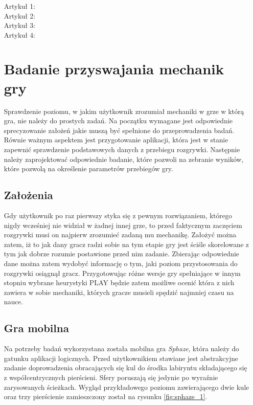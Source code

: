 \documentclass[a4paper,12pt,numbers=noenddot]{report}
\begin{document}
Artykuł 1: \cite{art_UsabilityEvaluationSystematicReview}\\
Artykuł 2: \cite{art_evaluationOfMGevaluationSystem}\\
Artykuł 3: \cite{art_playabilityHeuristics}\\
Artykuł 4: \cite{art_evaluationOfMG}


\chapter{Badanie przyswajania mechanik gry}
Sprawdzenie poziomu, w jakim użytkownik zrozumiał mechaniki w grze w którą gra, nie należy do prostych zadań. Na początku wymagane jest odpowiednie sprecyzowanie założeń jakie muszą być spełnione do przeprowadzenia badań. Równie ważnym aspektem jest przygotowanie aplikacji, która jest w stanie zapewnić sprawdzenie podstawowych danych z przebiegu rozgrywki. Następnie należy zaprojektować odpowiednie badanie, które pozwoli na zebranie wyników, które pozwolą na określenie parametrów przebiegów gry.
\section{Założenia}
Gdy użytkownik po raz pierwszy styka się z pewnym rozwiązaniem, którego nigdy wcześniej nie widział w żadnej innej grze, to przed faktycznym zaczęciem rozgrywki musi on najpierw zrozumieć zadaną mu mechanikę. Założyć można zatem, iż to jak dany gracz radzi sobie na tym etapie gry jest ściśle skorelowane z tym jak dobrze rozumie postawione przed nim zadanie. Zbierając odpowiednie dane można zatem wydobyć informację o tym, jaki poziom przystosowania do rozgrywki osiągnął gracz. Przygotowując różne wersje gry spełniające w innym stopniu wybrane heurystyki PLAY będzie zatem możliwe ocenić która z nich zawiera w sobie mechaniki, których gracze musieli spędzić najmniej czasu na nauce.

\section{Gra mobilna}
Na potrzeby badań wykorzystana została mobilna gra \textit{Sphaze}, która należy do gatunku aplikacji logicznych. Przed użytkownikiem stawiane jest abstrakcyjne zadanie doprowadzenia obracających się kul do środka labiryntu składającego się z współcentrycznych pierścieni. Sfery poruszają się jedynie po wyraźnie zarysowanych ścieżkach. Wygląd przykładowego poziomu zawierającego dwie kule oraz trzy pierścienie zamieszczony został na rysunku \ref{fig:sphaze_1}.
\end{document}
